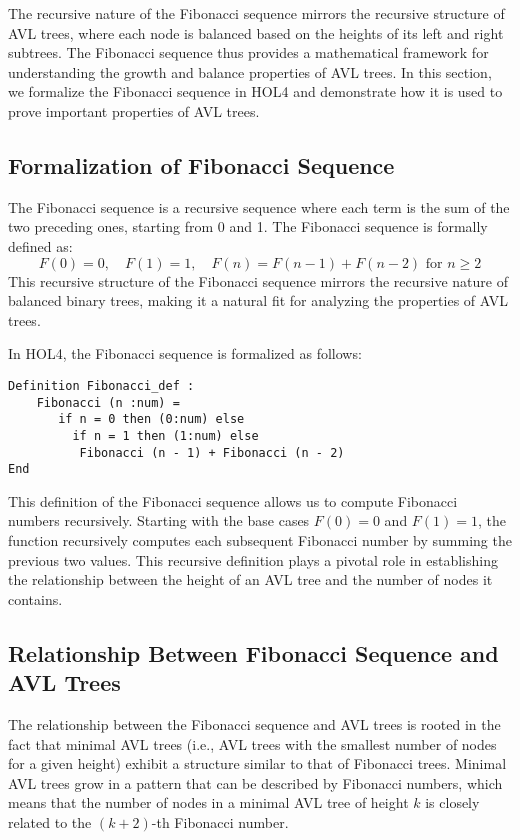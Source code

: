 \documentclass[12pt]{article}
\begin{document}
The recursive nature of the Fibonacci sequence mirrors the recursive structure of AVL trees, where each node is balanced based on the heights of its left and right subtrees. The Fibonacci sequence thus provides a mathematical framework for understanding the growth and balance properties of AVL trees. In this section, we formalize the Fibonacci sequence in HOL4 and demonstrate how it is used to prove important properties of AVL trees.

\subsection{Formalization of Fibonacci Sequence}

The Fibonacci sequence is a recursive sequence where each term is the sum of the two preceding ones, starting from 0 and 1. The Fibonacci sequence is formally defined as:
\[
F(0) = 0, \quad F(1) = 1, \quad F(n) = F(n-1) + F(n-2) \text{ for } n \geq 2
\]
This recursive structure of the Fibonacci sequence mirrors the recursive nature of balanced binary trees, making it a natural fit for analyzing the properties of AVL trees.

In HOL4, the Fibonacci sequence is formalized as follows:
\begin{verbatim}
Definition Fibonacci_def :
    Fibonacci (n :num) =
       if n = 0 then (0:num) else
         if n = 1 then (1:num) else
          Fibonacci (n - 1) + Fibonacci (n - 2)
End
\end{verbatim}

This definition of the Fibonacci sequence allows us to compute Fibonacci numbers recursively. Starting with the base cases \( F(0) = 0 \) and \( F(1) = 1 \), the function recursively computes each subsequent Fibonacci number by summing the previous two values. This recursive definition plays a pivotal role in establishing the relationship between the height of an AVL tree and the number of nodes it contains.

\subsection{Relationship Between Fibonacci Sequence and AVL Trees}

The relationship between the Fibonacci sequence and AVL trees is rooted in the fact that minimal AVL trees (i.e., AVL trees with the smallest number of nodes for a given height) exhibit a structure similar to that of Fibonacci trees. Minimal AVL trees grow in a pattern that can be described by Fibonacci numbers, which means that the number of nodes in a minimal AVL tree of height \( k \) is closely related to the \( (k+2) \)-th Fibonacci number.
\end{document}
